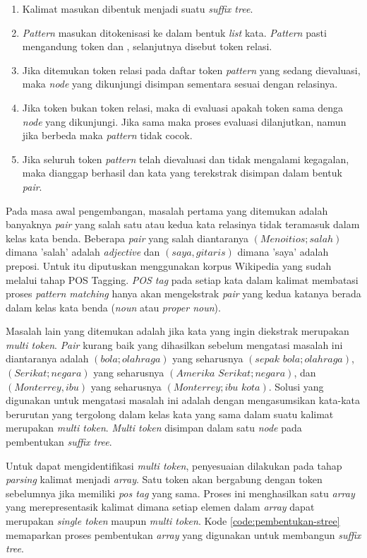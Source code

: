 \begin{enumerate}
  \item Kalimat masukan dibentuk menjadi suatu \textit{suffix tree}.
  \item \textit{Pattern} masukan ditokenisasi ke dalam bentuk \textit{list} 
  kata. \textit{Pattern} pasti mengandung token {\tagHypernym} dan {\tagHyponym}, selanjutnya disebut token relasi.
  \item Jika ditemukan token relasi pada daftar token \textit{pattern} yang sedang dievaluasi, maka \textit{node} yang dikunjungi disimpan sementara sesuai dengan relasinya.
  \item Jika token bukan token relasi, maka di evaluasi apakah token sama denga  \textit{node} yang dikunjungi. Jika sama maka proses evaluasi dilanjutkan, namun jika berbeda maka \textit{pattern} tidak cocok.
  \item Jika seluruh token \textit{pattern} telah dievaluasi dan tidak mengalami kegagalan, maka dianggap berhasil dan kata yang terekstrak disimpan dalam bentuk \textit{pair}.
\end{enumerate}

Pada masa awal pengembangan, masalah pertama yang ditemukan adalah banyaknya \textit{pair} yang salah satu atau kedua kata relasinya tidak teramasuk dalam kelas kata benda. Beberapa \textit{pair} yang salah diantaranya $(Menoitios;salah)$ dimana 'salah' adalah \textit{adjective} dan $(saya,gitaris)$ dimana 'saya' adalah preposi. Untuk itu diputuskan menggunakan korpus Wikipedia yang sudah melalui tahap POS Tagging. \textit{POS tag} pada setiap kata dalam kalimat membatasi proses \textit{pattern matching} hanya akan mengekstrak \textit{pair} yang kedua katanya berada dalam kelas kata benda (\textit{noun} atau \textit{proper noun}). 

Masalah lain yang ditemukan adalah jika kata yang ingin diekstrak merupakan \textit{multi token}. \textit{Pair} kurang baik yang dihasilkan sebelum mengatasi masalah ini diantaranya adalah $(bola;olahraga)$ yang seharusnya $(sepak\,\,bola;olahraga)$, $(Serikat;negara)$ yang seharusnya $(Amerika\,\,Serikat;negara)$, dan $(Monterrey,ibu)$ yang seharusnya $(Monterrey;ibu\,\,kota)$. Solusi yang digunakan untuk mengatasi masalah ini adalah dengan mengasumsikan kata-kata berurutan yang tergolong dalam kelas kata yang sama dalam suatu kalimat merupakan \textit{multi token}. \textit{Multi token} disimpan dalam satu \textit{node} pada pembentukan \textit{suffix tree}.

Untuk dapat mengidentifikasi \textit{multi token}, penyesuaian dilakukan pada tahap \textit{parsing} kalimat menjadi \textit{array}. Satu token akan bergabung dengan token sebelumnya jika memiliki \textit{pos tag} yang sama. Proses ini menghasilkan satu \textit{array} yang merepresentasik kalimat dimana setiap elemen dalam \textit{array} dapat merupakan \textit{single token} maupun \textit{multi token}. Kode \ref{code:pembentukan-stree} memaparkan proses pembentukan \textit{array} yang digunakan untuk membangun \textit{suffix tree}.

